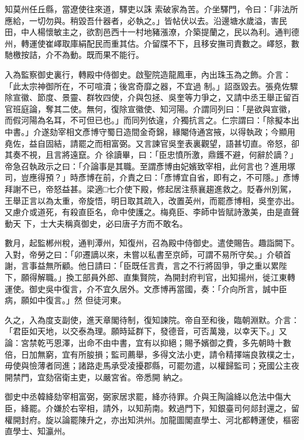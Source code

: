 \begin{pinyinscope}
 知莫州任丘縣，當遼使往來道，驛吏以誅
 索破家為苦。介坐驛門，令曰：「非法所應給，一切勿與。稍毀吾什器者，必執之。」皆帖伏以去。沿邊塘水歲溢，害民田，中人楊懷敏主之，欲割邑西十一村地豬漲潦，介築提蘭之，民以為利。通判德州，轉運使崔嶧取庫絹配民而重其估。介留牒不下，且移安撫司責數之。嶧怒，數馳檄按詰，介不為動。既而果不能行。



 入為監察御史裏行，轉殿中侍御史。啟聖院造龍鳳車，內出珠玉為之飾。介言：「此太宗神御所在，不可喧瀆；後宮奇靡之器，不宜過
 制。」詔亟毀去。張堯佐驟除宣徽、節度、景靈、群牧四使，介與包拯、吳奎等力爭之，又請中丞王舉正留百官班庭論，奪其二使。無何，復除宣徽使、知河陽。介謂同列曰：「是欲與宣徽，而假河陽為名耳，不可但已也。」而同列依違，介獨抗言之。仁宗謂曰：「除擬本出中書。」介遂劾宰相文彥博守蜀日造間金奇錦，緣閹侍通宮掖，以得執政；今顯用堯佐，益自固結，請罷之而相富弼。又言諫官吳奎表裏觀望，語甚切直。帝怒，卻其奏不視，且言將遠竄。介
 徐讀畢，曰：「臣忠憤所激，鼎鑊不避，何辭於謫？」帝急召執政示之曰：「介論事是其職。至謂彥博由妃嬪致宰相，此何言也？進用塚司，豈應得預？」時彥博在前，介責之曰：「彥博宜自省，即有之，不可隱。」彥博拜謝不已，帝怒益甚。梁適□七介使下殿，修起居注蔡襄趨進救之。貶春州別駕，王舉正言以為太重，帝旋悟，明日取其疏入，改置英州，而罷彥博相，吳奎亦出。又慮介或道死，有殺直臣名，命中使護之。梅堯臣、李師中皆賦詩激美，由是直聲動天
 下，士大夫稱真御史，必曰唐子方而不敢名。



 數月，起監郴州稅，通判潭州，知復州，召為殿中侍御史。遣使賜告。趣詣闕下。入對，帝勞之曰：「卯遷謫以來，未嘗以私書至京師，可謂不易所守矣。」介頓首謝，言事益無所顧。他日請曰：「臣既任言責，言之不行將固爭，爭之重以累陛下，願得解職。」換工部員外郎、直集賢院，為開封府判官，出知揚州，徙江東轉運使。御史吳中復言，介不宜久居外。文彥博再當國，奏：「介向所言，誠中臣病，願如中復言。」然
 但徒河東。



 久之，入為度支副使，進天章閣待制，復知諫院。帝自至和後，臨朝淵默。介言：「君臣如天地，以交泰為理。願時延群下，發德音，可否萬幾，以幸天下。」又論：宮禁乾丐恩澤，出命不由中書，宜有以抑絕；賜予嬪御之費，多先朝時十數倍，日加無窮，宜有所朘損；監司薦舉，多得文法小吏，請令精擇端良敦樸之士，毋使與憸薄者同進；諸路走馬承受凌擾郡縣，可罷勿遣，以權歸監司；兗國公主夜開禁門，宜劾宿衛主吏，以嚴宮省。帝悉開
 納之。



 御史中丞韓絳劾宰相富弼，弼家居求罷，絳亦待罪。介與王陶論絳以危法中傷大臣，絳罷。介嫌於右宰相，請外，以知荊南。敕過門下，知銀臺司何郯封還之，留權開封府。旋以論罷陳升之，亦出知洪州。加龍圖閣直學士、河北都轉運使，樞密直學士、知瀛州。




\end{pinyinscope}

